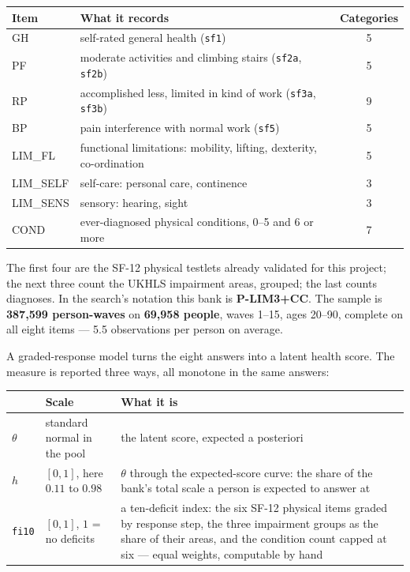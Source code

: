 \documentclass[11pt]{article}
\newcommand{\code}[1]{\texttt{\small #1}}
\begin{document}
\begin{center}\small
\begin{tabular}{llc}
\toprule
Item & What it records & Categories \\
\midrule
GH & self-rated general health (\code{sf1}) & 5 \\
PF & moderate activities and climbing stairs (\code{sf2a}, \code{sf2b}) & 5 \\
RP & accomplished less, limited in kind of work (\code{sf3a}, \code{sf3b}) & 9 \\
BP & pain interference with normal work (\code{sf5}) & 5 \\
LIM\_FL & functional limitations: mobility, lifting, dexterity, co-ordination & 5 \\
LIM\_SELF & self-care: personal care, continence & 3 \\
LIM\_SENS & sensory: hearing, sight & 3 \\
COND & ever-diagnosed physical conditions, 0--5 and 6 or more & 7 \\
\bottomrule
\end{tabular}
\end{center}

The first four are the SF-12 physical testlets already validated for this
project; the next three count the UKHLS impairment areas, grouped; the last
counts diagnoses. In the search's notation this bank is \textbf{P-LIM3+CC}.
The sample is \textbf{387{,}599 person-waves} on \textbf{69{,}958 people},
waves 1--15, ages 20--90, complete on all eight items --- 5.5 observations per
person on average.

A graded-response model turns the eight answers into a latent health score.
The measure is reported three ways, all monotone in the same answers:

\begin{center}\small
\begin{tabular}{llp{8.4cm}}
\toprule
 & Scale & What it is \\
\midrule
$\theta$ & standard normal in the pool & the latent score, expected a posteriori \\
$h$ & $[0,1]$, here $0.11$ to $0.98$ & $\theta$ through the expected-score curve: the share of the bank's total scale a person is expected to answer at \\
\code{fi10} & $[0,1]$, $1$ = no deficits & a ten-deficit index: the six SF-12 physical items graded by response step, the three impairment groups as the share of their areas, and the condition count capped at six --- equal weights, computable by hand \\
\bottomrule
\end{tabular}
\end{center}
\end{document}
